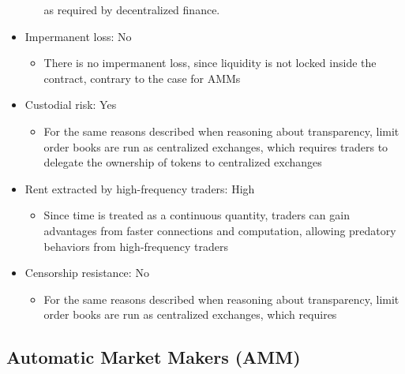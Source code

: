 \documentclass[11pt, reqno]{amsart}
\theoremstyle{definition}
\theoremstyle{remark}
\begin{document}
\begin{itemize}
\begin{itemize}
                    as required by decentralized finance.
          \end{itemize}
    \item Impermanent loss: No
          \begin{itemize}
              \item There is no impermanent loss, since liquidity is not locked inside
                    the contract, contrary to the case for AMMs
          \end{itemize}
    \item Custodial risk: Yes
          \begin{itemize}
              \item For the same reasons described when reasoning about transparency,
                    limit order books are run as centralized exchanges, which requires
                    traders to delegate the ownership of tokens to centralized exchanges
          \end{itemize}
    \item Rent extracted by high-frequency traders: High
          \begin{itemize}
              \item Since time is treated as a continuous quantity, traders can
                    gain advantages from faster connections and computation, allowing
                    predatory behaviors from high-frequency traders
                    \cite{BuCrSh15}
          \end{itemize}
    \item Censorship resistance: No
          \begin{itemize}
              \item For the same reasons described when reasoning about transparency,
                    limit order books are run as centralized exchanges, which requires

          \end{itemize}
\end{itemize}

\subsection{Automatic Market Makers (AMM)}
\end{document}

